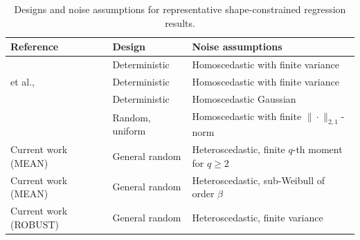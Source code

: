 \documentclass[12pt]{article}
\begin{document}
\begin{table}[!htbp]
\centering
\small
\renewcommand{\arraystretch}{1.2}
\setlength{\tabcolsep}{6pt}
\begin{tabular}{l l l} %
\hline
\textbf{Reference} &
\textbf{Design} &
\textbf{Noise assumptions} \\
\hline

\cite{zhang2002risk} &
Deterministic &
Homoscedastic with finite variance \\

\citeauthor{chatterjee2015risk} et al., \citeyear{chatterjee2015risk}&
Deterministic &
Homoscedastic with finite variance \\

\cite{bellec2018sharp} &
Deterministic &
Homoscedastic Gaussian \\

\cite{han2018robustness} &
Random, uniform &
Homoscedastic with finite $\|\cdot\|_{2,1}$-norm \\
\hline

Current work (MEAN) &
General random &
Heteroscedastic, finite $q$-th moment for  $q \ge 2$ \\

Current work (MEAN) &
General random &
Heteroscedastic, sub-Weibull of order $\beta$ \\

Current work (ROBUST) &
General random &
Heteroscedastic, finite variance \\
\hline
\end{tabular}
\caption{Designs and noise assumptions for representative shape-constrained regression results.}
\label{tab:shape-literature-design-noise}
\end{table}
\end{document}
